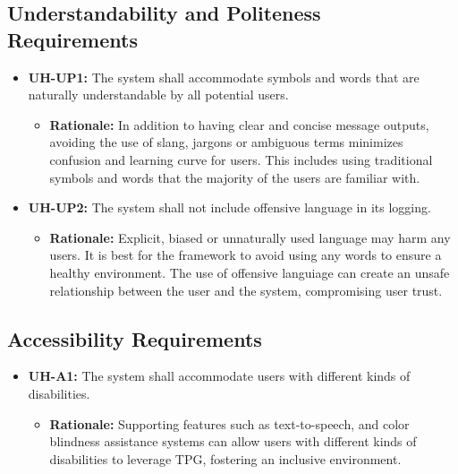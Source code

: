 \documentclass[12pt]{article}
\begin{document}
\subsection{Understandability and Politeness Requirements}
\begin{itemize}
  \item \textbf{UH-UP1:} The system shall accommodate symbols and words that are naturally understandable by all potential users.
  \begin{itemize}
    \item \textbf{Rationale:} In addition to having clear and concise message outputs, avoiding the use of slang, jargons or ambiguous terms minimizes confusion and learning curve for users. This includes using traditional symbols and words that the majority of the users are familiar with.
  \end{itemize}
  \item \textbf{UH-UP2:} The system shall not include offensive language in its logging.
  \begin{itemize}
    \item \textbf{Rationale:} Explicit, biased or unnaturally used language may harm any users. It is best for the framework to avoid using any words to ensure a healthy environment. The use of offensive languiage can create an unsafe relationship between the user and the system, compromising user trust.
  \end{itemize}
\end{itemize}

\subsection{Accessibility Requirements}
\begin{itemize}
  \item \textbf{UH-A1:} The system shall accommodate users with different kinds of disabilities.
  \begin{itemize}
    \item \textbf{Rationale:} Supporting features such as text-to-speech, and color blindness assistance systems can allow users with different kinds of disabilities to leverage TPG, fostering an inclusive environment.
  \end{itemize}
\end{itemize}
\end{document}
